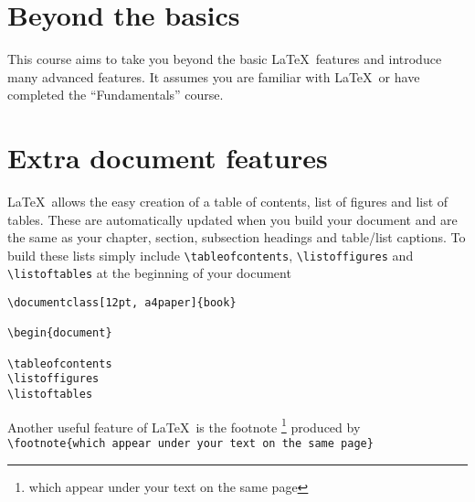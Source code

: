 \documentclass[12pt, a4paper]{book}
\begin{document}
\section*{Beyond the basics}
This course aims to take you beyond the basic \LaTeX\ features and introduce many advanced features.  It assumes you are familiar with \LaTeX\ or have completed the ``Fundamentals'' course.



\section*{Extra document features}
\LaTeX\ allows the easy creation of a table of contents, list of figures and list of tables.  These are automatically updated when you build your document and are the same as your chapter, section, subsection headings and table/list captions.  To build these lists simply include \verb+\tableofcontents+, \verb+\listoffigures+ and \verb+\listoftables+ at the beginning of your document
\begin{center}
\begin{minipage}[t]{14.5cm}
\begin{verbatim}
\documentclass[12pt, a4paper]{book}

\begin{document}

\tableofcontents
\listoffigures
\listoftables
\end{verbatim}
\end{minipage}
\end{center}

Another useful feature of \LaTeX\ is the footnote \footnote{which appear under your text on the same page} produced by \\
\verb+\footnote{which appear under your text on the same page}+
\end{document}
